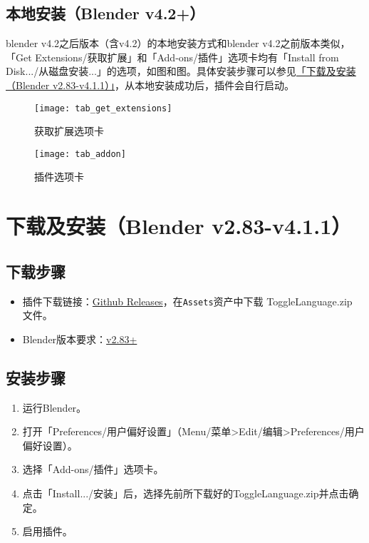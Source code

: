 \documentclass{../../public_resources/doc}
\begin{document}
\subsection{本地安装（Blender v4.2+）}
\hypertarget{local_install}{}
blender v4.2之后版本（含v4.2）的本地安装方式和blender v4.2之前版本类似，「Get Extensions/获取扩展」和「Add‐ons/插件」选项卡均有「Install from Disk.../从磁盘安装...」的选项，如图和图。具体安装步骤可以参见\hyperlink{install_v283_v411}{「下载及安装（Blender v2.83-v4.1.1）」}，从本地安装成功后，插件会自行启动。

\begin{figure}[h!]
    \begin{minipage}[t]{0.48\linewidth}
        \texttt{[image: tab\_get\_extensions]}
        \caption{获取扩展选项卡}
        \label{获取扩展选项卡}
    \end{minipage}
    \quad
    \begin{minipage}[t]{0.48\linewidth}
        \texttt{[image: tab\_addon]}
        \caption{插件选项卡}
        \label{插件选项卡}
    \end{minipage}
\end{figure}

\section{下载及安装（Blender v2.83-v4.1.1）}
\hypertarget{install_v283_v411}{}
\subsection{下载步骤}
\begin{itemize}
    \item 插件下载链接：\href{https://github.com/Mister-Kin/ToggleLanguage/releases/latest}{Github Releases}，在\lstinline|Assets|资产中下载 ToggleLanguage.zip 文件。
    \item Blender版本要求：\href{https://www.blender.org/download/}{v2.83+}
\end{itemize}

\subsection{安装步骤}
\begin{enumerate}
    \item 运行Blender。
    \item 打开「Preferences/用户偏好设置」（Menu/菜单>Edit/编辑>Preferences/用户偏好设置）。
    \item 选择「Add-ons/插件」选项卡。
    \item 点击「Install.../安装」后，选择先前所下载好的ToggleLanguage.zip并点击确定。
    \item 启用插件。
\end{enumerate}
\end{document}
